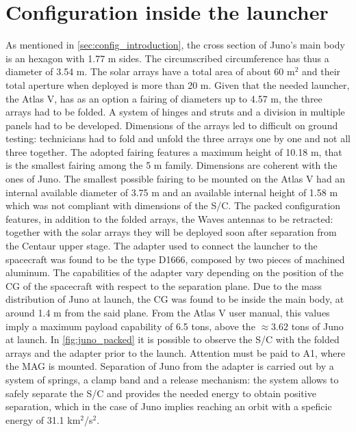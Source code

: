 \section{Configuration inside the launcher}
\label{sec:config_launcher}

As mentioned in \autoref{sec:config_introduction}, the cross section of Juno's main body is an hexagon with 1.77 m sides. The circumscribed circumference has thus a diameter of 3.54 m. The solar arrays have a total area of about 60 m$^2$ and their total aperture when deployed is more than 20 m.\cite{masses_ref} Given that the needed launcher, the Atlas V, has as an option a fairing of diameters up to 4.57 m, the three arrays had to be folded. A system of hinges and struts and a division in multiple panels had to be developed.\cite{solar_panels_coef} Dimensions of the arrays led to difficult on ground testing: technicians had to fold and unfold the three arrays one by one and not all three together.\cite{solar_panels_testing} The adopted fairing features a maximum height of 10.18 m, that is the smallest fairing among the 5 m family\cite{atlas_manual}. Dimensions are coherent with the ones of Juno. The smallest possible fairing to be mounted on the Atlas V had an internal available diameter of 3.75 m 
and an available internal height of 1.58 m which was not compliant with dimensions of the S/C. 
The packed configuration features, in addition to the folded arrays, the Waves antennas to be retracted: together with the solar arrays they will be deployed soon after separation from the Centaur upper stage. 
The adapter used to connect the launcher to the spacecraft was found to be the type D1666, composed by two pieces of machined aluminum. The capabilities of the adapter vary depending on the position of the CG of the spacecraft with respect to the separation plane. Due to the mass distribution of Juno at launch, the CG was found to be inside the main body, at around 1.4 m from the said plane. From the Atlas V user manual\cite{atlas_manual}, this values imply a maximum payload capability of 6.5 tons, above the $\approx 3.62$ tons of Juno at launch.\cite{masses_ref}
In \autoref{fig:juno_packed}\cite{foto_fairing} it is possible to observe the S/C with the folded arrays and the adapter prior to the launch. Attention must be paid to A1, where the MAG is mounted. 
Separation of Juno from the adapter is carried out by a system of springs, a clamp band and a release mechanism: the system allows to safely separate the S/C and provides the needed energy to obtain positive separation, which in the case of Juno implies reaching an orbit with a speficic energy of 31.1 km$^2$/s$^2$. 

